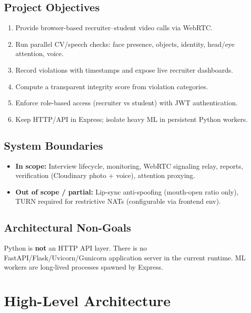 \documentclass[11pt,a4paper]{report}
\begin{document}
\section{Project Objectives}
\begin{enumerate}[label=\textbf{O\arabic*.}]
  \item Provide browser-based recruiter--student video calls via WebRTC.
  \item Run parallel CV/speech checks: face presence, objects, identity, head/eye attention, voice.
  \item Record violations with timestamps and expose live recruiter dashboards.
  \item Compute a transparent integrity score from violation categories.
  \item Enforce role-based access (recruiter vs student) with JWT authentication.
  \item Keep HTTP/API in Express; isolate heavy ML in persistent Python workers.
\end{enumerate}

\section{System Boundaries}
\begin{itemize}
  \item \textbf{In scope:} Interview lifecycle, monitoring, WebRTC signaling relay, reports, verification (Cloudinary photo + voice), attention proxying.
  \item \textbf{Out of scope / partial:} Lip-sync anti-spoofing (mouth-open ratio only), TURN required for restrictive NATs (configurable via frontend env).
\end{itemize}

\section{Architectural Non-Goals}
Python is \textbf{not} an HTTP API layer. There is no FastAPI/Flask/Uvicorn/Gunicorn application server in the current runtime. ML workers are long-lived processes spawned by Express.

\chapter{High-Level Architecture}
\end{document}
